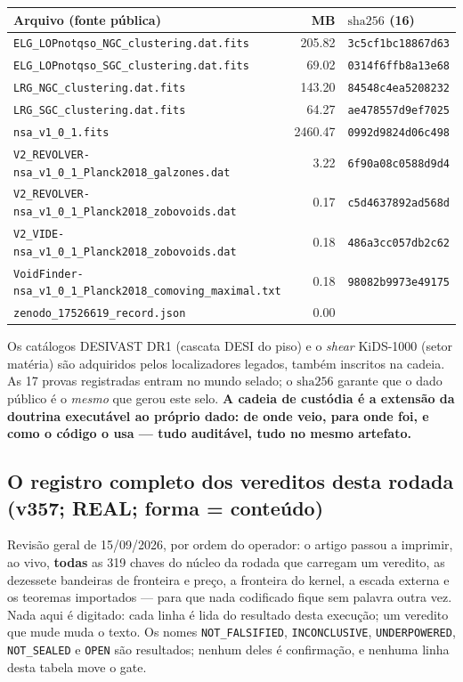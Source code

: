 \documentclass[11pt]{article}
\theoremstyle{definition}\newtheorem{deriv}{Derivação}
\begin{document}
\begin{center}\footnotesize\begin{longtable}{@{}p{}rl@{}}\toprule Arquivo (fonte pública) & MB & $\mathrm{sha}256$ (16) \\ \midrule\endhead \texttt{ELG\_LOPnotqso\_NGC\_clustering.dat.fits} & 205.82 & \texttt{3c5cf1bc18867d63} \\  \texttt{ELG\_LOPnotqso\_SGC\_clustering.dat.fits} & 69.02 & \texttt{0314f6ffb8a13e68} \\  \texttt{LRG\_NGC\_clustering.dat.fits} & 143.20 & \texttt{84548c4ea5208232} \\  \texttt{LRG\_SGC\_clustering.dat.fits} & 64.27 & \texttt{ae478557d9ef7025} \\  \texttt{nsa\_v1\_0\_1.fits} & 2460.47 & \texttt{0992d9824d06c498} \\  \texttt{V2\_REVOLVER-nsa\_v1\_0\_1\_Planck2018\_galzones.dat} & 3.22 & \texttt{6f90a08c0588d9d4} \\  \texttt{V2\_REVOLVER-nsa\_v1\_0\_1\_Planck2018\_zobovoids.dat} & 0.17 & \texttt{c5d4637892ad568d} \\  \texttt{V2\_VIDE-nsa\_v1\_0\_1\_Planck2018\_zobovoids.dat} & 0.18 & \texttt{486a3cc057db2c62} \\  \texttt{VoidFinder-nsa\_v1\_0\_1\_Planck2018\_comoving\_maximal.txt} & 0.18 & \texttt{98082b9973e49175} \\  \texttt{zenodo\_17526619\_record.json} & 0.00 & \texttt{} \\ \bottomrule\end{longtable}\end{center}

Os catálogos DESIVAST DR1 (cascata DESI do piso) e o \emph{shear} KiDS-1000 (setor matéria) são adquiridos pelos localizadores legados, também inscritos na cadeia. As 17 provas registradas entram no mundo selado; o $\mathrm{sha}256$ garante que o dado público é o \emph{mesmo} que gerou este selo. \textbf{A cadeia de custódia é a extensão da doutrina executável ao próprio dado: de onde veio, para onde foi, e como o código o usa --- tudo auditável, tudo no mesmo artefato.}

\subsection*{O registro completo dos vereditos desta rodada (v357; REAL; forma = conteúdo)}

Revisão geral de 15/09/2026, por ordem do operador: o artigo passou a imprimir, ao vivo, \textbf{todas} as 319 chaves do núcleo da rodada que carregam um veredito, as dezessete bandeiras de fronteira e preço, a fronteira do kernel, a escada externa e os teoremas importados --- para que nada codificado fique sem palavra outra vez. Nada aqui é digitado: cada linha é lida do resultado desta execução; um veredito que mude muda o texto. Os nomes \texttt{NOT\_FALSIFIED}, \texttt{INCONCLUSIVE}, \texttt{UNDERPOWERED}, \texttt{NOT\_SEALED} e \texttt{OPEN} são resultados; nenhum deles é confirmação, e nenhuma linha desta tabela move o gate.
\end{document}
